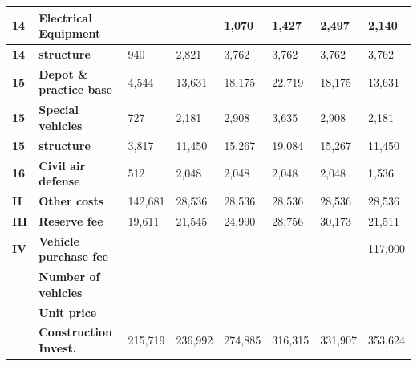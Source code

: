 \documentclass[12pt]{article}
\begin{document}
\begin{table}[htbp]
\begin{tabular}{l|l|l|l|l|l|l|l}
    \hline
    \rowcolor[rgb]{ .973,  .796,  .678} \textbf{14} & \textbf{Electrical Equipment} &       &       &                 1,070  &        1,427  &        2,497  &        2,140  \\
    \hline
    \rowcolor[rgb]{ .988,  .894,  .839} \textbf{14} & \textbf{structure} &           940  &        2,821  &                 3,762  &        3,762  &        3,762  &        3,762  \\
    \hline
    \rowcolor[rgb]{ .973,  .796,  .678} \textbf{15} & \textbf{Depot \& practice base} &        4,544  &      13,631  &               18,175  &      22,719  &      18,175  &      13,631  \\
    \hline
    \rowcolor[rgb]{ .988,  .894,  .839} \textbf{15} & \textbf{Special vehicles} &           727  &        2,181  &                 2,908  &        3,635  &        2,908  &        2,181  \\
    \hline
    \rowcolor[rgb]{ .973,  .796,  .678} \textbf{15} & \textbf{structure} &        3,817  &      11,450  &               15,267  &      19,084  &      15,267  &      11,450  \\
    \hline
    \rowcolor[rgb]{ .988,  .894,  .839} \textbf{16} & \textbf{Civil air defense} &           512  &        2,048  &                 2,048  &        2,048  &        2,048  &        1,536  \\
    \hline
    \rowcolor[rgb]{ .973,  .796,  .678} \textbf{II} & \textbf{Other costs} &    142,681  &      28,536  &               28,536  &      28,536  &      28,536  &      28,536  \\
    \hline
    \rowcolor[rgb]{ .988,  .894,  .839} \textbf{III} & \textbf{Reserve fee} &      19,611  &      21,545  &               24,990  &      28,756  &      30,173  &      21,511  \\
    \hline
    \rowcolor[rgb]{ .973,  .796,  .678} \textbf{IV} & \textbf{Vehicle purchase fee} &       &       &       &       &       &    117,000  \\
    \hline
    \rowcolor[rgb]{ .988,  .894,  .839}       & \textbf{Number of vehicles } &       &       &       &       &       &  \\
    \hline
    \rowcolor[rgb]{ .973,  .796,  .678}       & \textbf{Unit price} &       &       &       &       &       &  \\
    \hline
    \rowcolor[rgb]{ .988,  .894,  .839}       & \textbf{Construction Invest.} &    215,719  &    236,992  &             274,885  &    316,315  &    331,907  &    353,624  \\

\end{tabular}
\end{table}
\end{document}
